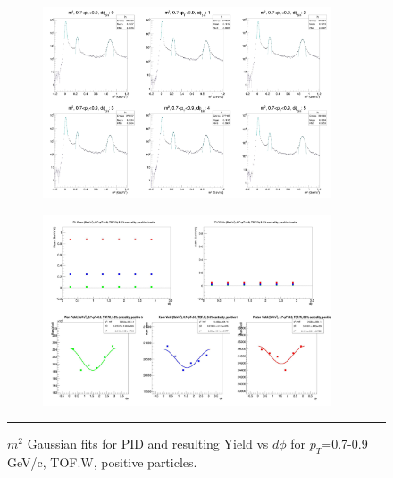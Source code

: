 \begin{figure}[H]
  \centering
    \begin{subfigure}[p]{1\textwidth}
   \centering
   \includegraphics[width=0.94\textwidth]{lowptfits/yieldvsdphi_tof1_cent0_ch1_pT-7-9.jpg}
    \end{subfigure}
    \begin{subfigure}[p]{1\textwidth}
   \centering
   \includegraphics[width=0.94\textwidth]{lowptfits/fitParams_tof1_cent0_ch1_pT-7-9.jpg}
    \end{subfigure}
    \rule{35em}{0.5pt}
  \caption[PID fits and Yield vs $d\phi$ for $p_T$=0.7-0.9 GeV/c, TOF.W, positive particles. ]{$m^2$ Gaussian fits for PID and resulting Yield vs $d\phi$ for $p_T$=0.7-0.9 GeV/c, TOF.W, positive particles.}
  \label{fig:fits7-9pos}
\end{figure}


